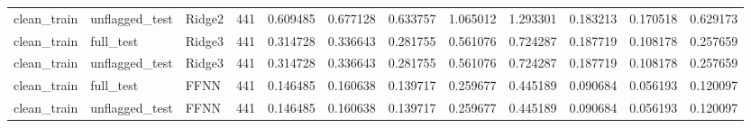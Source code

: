 \begin{tabular}{lllrrrrrrrrr}
clean_train & unflagged_test & Ridge2 & 441 & 0.609485 & 0.677128 & 0.633757 & 1.065012 & 1.293301 & 0.183213 & 0.170518 & 0.629173 \\
clean_train & full_test & Ridge3 & 441 & 0.314728 & 0.336643 & 0.281755 & 0.561076 & 0.724287 & 0.187719 & 0.108178 & 0.257659 \\
clean_train & unflagged_test & Ridge3 & 441 & 0.314728 & 0.336643 & 0.281755 & 0.561076 & 0.724287 & 0.187719 & 0.108178 & 0.257659 \\
clean_train & full_test & FFNN & 441 & 0.146485 & 0.160638 & 0.139717 & 0.259677 & 0.445189 & 0.090684 & 0.056193 & 0.120097 \\
clean_train & unflagged_test & FFNN & 441 & 0.146485 & 0.160638 & 0.139717 & 0.259677 & 0.445189 & 0.090684 & 0.056193 & 0.120097 \\
\bottomrule
\end{tabular}

